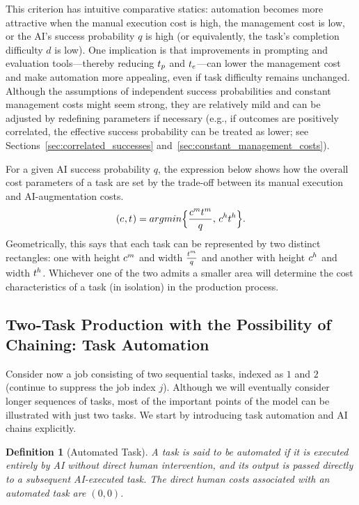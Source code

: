 \documentclass{article}
\theoremstyle{plain}
\theoremstyle{plain}
\newtheorem{definition}[theorem]{Definition}
\begin{document}
This criterion has intuitive comparative statics: automation becomes more attractive when the manual execution cost is high, the management cost is low, or the AI's success probability $q$ is high (or equivalently, the task's completion difficulty $d$ is low).
One implication is that improvements in prompting and evaluation tools---thereby reducing $t_{p}$ and $t_{e}$---can lower the management cost and make automation more appealing, even if task difficulty remains unchanged.
Although the assumptions of independent success probabilities and constant management costs might seem strong, they are relatively mild and can be adjusted by redefining parameters if necessary (e.g., if outcomes are positively correlated, the effective success probability can be treated as lower; see Sections~\ref{sec:correlated_successes} and~\ref{sec:constant_management_costs}).

For a given AI success probability $q$, the expression below shows how the overall cost parameters of a task are set by the trade-off between its manual execution and AI-augmentation costs.
$$(c_{}, t_{}) = argmin \Bigl\{\frac{c^{m}_{} t^{m}_{}}{q},\, c^{h}_{} t^{h}_{}\Bigr\}.$$
Geometrically, this says that each task can be represented by two distinct rectangles: one with height $c^{m}_{}$ and width $\frac{t^{m}_{}}{q}$ and another with height  $c^{h}_{}$ and width $t^{h}_{}$.
Whichever one of the two admits a smaller area will determine the cost characteristics of a task (in isolation) in the production process.



\subsection{Two-Task Production with the Possibility of Chaining: Task Automation}
Consider now a job consisting of two sequential tasks, indexed as $1$ and $2$ (continue to suppress the job index $j$).
Although we will eventually consider longer sequences of tasks, most of the important points of the model can be illustrated with just two tasks.
We start by introducing task automation and AI chains explicitly.
\begin{definition}[Automated Task]
\label{def:automated_task}
A task is said to be automated if it is executed entirely by AI without direct human intervention, and its output is passed directly to a subsequent AI-executed task.
The direct human costs associated with an automated task are $(0,0)$.
\end{definition}
\end{document}
